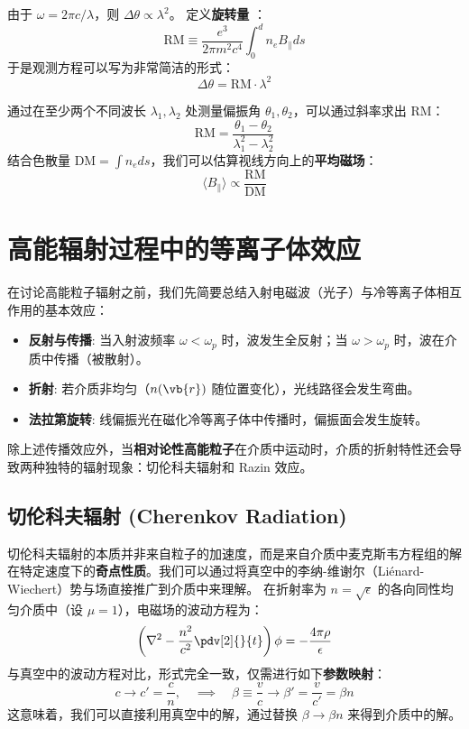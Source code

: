 由于 $\omega = 2\pi c / \lambda$，则 $\Delta \theta \propto \lambda^2$。
定义\textbf{旋转量} ：
\begin{equation}
    \text{RM} \equiv \frac{e^3}{2\pi m^2 c^4} \int_0^d n_e B_\parallel ds
\end{equation}
于是观测方程可以写为非常简洁的形式：
\begin{equation}
    \Delta \theta = \text{RM} \cdot \lambda^2
\end{equation}

\begin{derivationnote}[测量方法]
    通过在至少两个不同波长 $\lambda_1, \lambda_2$ 处测量偏振角 $\theta_1, \theta_2$，可以通过斜率求出 RM：
    \[ \text{RM} = \frac{\theta_1 - \theta_2}{\lambda_1^2 - \lambda_2^2} \]
    结合色散量 $\text{DM} = \int n_e ds$，我们可以估算视线方向上的\textbf{平均磁场}：
    \[ \langle B_\parallel \rangle \propto \frac{\text{RM}}{\text{DM}} \]
\end{derivationnote}

\section{高能辐射过程中的等离子体效应}

在讨论高能粒子辐射之前，我们先简要总结入射电磁波（光子）与冷等离子体相互作用的基本效应：
\begin{itemize}
    \item \textbf{反射与传播}: 当入射波频率 $\omega < \omega_p$ 时，波发生全反射；当 $\omega > \omega_p$ 时，波在介质中传播（被散射）。
    \item \textbf{折射}: 若介质非均匀（$n(\vb{r})$ 随位置变化），光线路径会发生弯曲。
    \item \textbf{法拉第旋转}: 线偏振光在磁化冷等离子体中传播时，偏振面会发生旋转。
\end{itemize}
除上述传播效应外，当\textbf{相对论性高能粒子}在介质中运动时，介质的折射特性还会导致两种独特的辐射现象：切伦科夫辐射和 Razin 效应。


\subsection{切伦科夫辐射 (Cherenkov Radiation)}

切伦科夫辐射的本质并非来自粒子的加速度，而是来自介质中麦克斯韦方程组的解在特定速度下的\textbf{奇点性质}。我们可以通过将真空中的李纳-维谢尔（Liénard-Wiechert）势与场直接推广到介质中来理解。
在折射率为 $n=\sqrt{\epsilon}$ 的各向同性均匀介质中（设 $\mu=1$），电磁场的波动方程为：
\begin{equation}
    \left( \nabla^2 - \frac{n^2}{c^2} \pdv[2]{}{t} \right) \phi = - \frac{4\pi \rho}{\epsilon}
\end{equation}
与真空中的波动方程对比，形式完全一致，仅需进行如下\textbf{参数映射}：
\begin{equation}
    c \to c' = \frac{c}{n}, \quad \implies \quad \beta \equiv \frac{v}{c} \to \beta' = \frac{v}{c'} = \beta n
\end{equation}
这意味着，我们可以直接利用真空中的解，通过替换 $\beta \to \beta n$ 来得到介质中的解。


